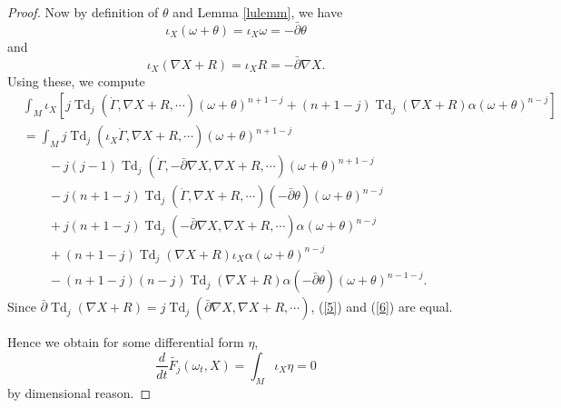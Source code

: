\documentclass[10pt,a4paper]{amsart}
\DeclareMathOperator{\Td}{Td}
\def\a{\alpha}
\def\bp{\bar\partial}
\begin{document}
\begin{proof}
Now by definition of $\theta$ and Lemma \ref{lulemm}, we have
\begin{equation}\label{lem1}
\iota_X (\omega+\theta)=\iota_X \omega = -\bp\theta
\end{equation}
and
\begin{equation}\label{lem2}
\iota_X (\nabla X+ R)=\iota_X R = -\bp\nabla X.
\end{equation}
Using these, we compute
\begin{align}\label{6}
&\int_M \iota_X \left[j\Td_j(\dot{\Gamma},\nabla X+R,\cdots)(\omega+\theta)^{n+1-j}+(n+1-j)\Td_j(\nabla X+R)\a(\omega+\theta)^{n-j} \right]\nonumber\\
&=\int_M j\Td_j(\iota_X \dot{\Gamma},\nabla X+R,\cdots)(\omega+\theta)^{n+1-j}\nonumber\\
&\qquad-j(j-1)\Td_j(\dot{\Gamma},-\bp\nabla X,\nabla X+R,\cdots)(\omega+\theta)^{n+1-j}\nonumber\\
&\qquad -j(n+1-j)\Td_j (\dot{\Gamma},\nabla X+R,\cdots)(-\bp\theta)(\omega+\theta)^{n-j} \nonumber\\
&\qquad +j(n+1-j)\Td_j (-\bp\nabla X,\nabla X+R,\cdots)\a(\omega+\theta)^{n-j} \nonumber\\
&\qquad +(n+1-j) \Td_j (\nabla X+R) \iota_X \a (\omega+\theta)^{n-j} \nonumber\\
&\qquad -(n+1-j)(n-j)\Td_j (\nabla X+R) \a (-\bp\theta)(\omega+\theta)^{n-1-j}.
\end{align}
Since $\bp \Td_j(\nabla X + R)=j\Td_j(\bp\nabla X,\nabla X + R,\cdots)$, (\ref{5}) and (\ref{6}) are equal.

Hence we obtain for some differential form $\eta$,
\begin{equation*}
\frac{d}{dt}\widetilde{F_j}(\omega_t,X)=\int_M \iota_X \eta =0
\end{equation*}
by dimensional reason.


\end{proof}
\end{document}
